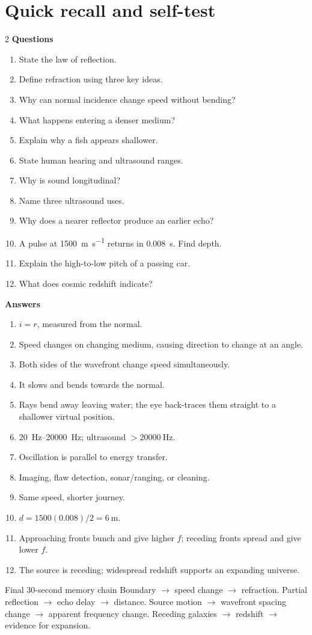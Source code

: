 \documentclass[11pt,a4paper]{article}
\begin{document}
\section{Quick recall and self-test}
\begin{multicols}{2}
\textbf{Questions}
\begin{enumerate}
\item State the law of reflection.
\item Define refraction using three key ideas.
\item Why can normal incidence change speed without bending?
\item What happens entering a denser medium?
\item Explain why a fish appears shallower.
\item State human hearing and ultrasound ranges.
\item Why is sound longitudinal?
\item Name three ultrasound uses.
\item Why does a nearer reflector produce an earlier echo?
\item A pulse at \SI{1500}{\metre\per\second} returns in \SI{0.008}{\second}. Find depth.
\item Explain the high-to-low pitch of a passing car.
\item What does cosmic redshift indicate?
\end{enumerate}
\columnbreak
\textbf{Answers}
\begin{enumerate}
\item $i=r$, measured from the normal.
\item Speed changes on changing medium, causing direction to change at an angle.
\item Both sides of the wavefront change speed simultaneously.
\item It slows and bends towards the normal.
\item Rays bend away leaving water; the eye back-traces them straight to a shallower virtual position.
\item \SIrange{20}{20000}{\hertz}; ultrasound $>\SI{20000}{\hertz}$.
\item Oscillation is parallel to energy transfer.
\item Imaging, flaw detection, sonar/ranging, or cleaning.
\item Same speed, shorter journey.
\item $d=1500(0.008)/2=\SI{6}{\metre}$.
\item Approaching fronts bunch and give higher $f$; receding fronts spread and give lower $f$.
\item The source is receding; widespread redshift supports an expanding universe.
\end{enumerate}
\end{multicols}

\begin{keybox}{Final 30-second memory chain}
Boundary $\to$ speed change $\to$ refraction. Partial reflection $\to$ echo delay $\to$ distance. Source motion $\to$ wavefront spacing change $\to$ apparent frequency change. Receding galaxies $\to$ redshift $\to$ evidence for expansion.
\end{keybox}
\end{document}

